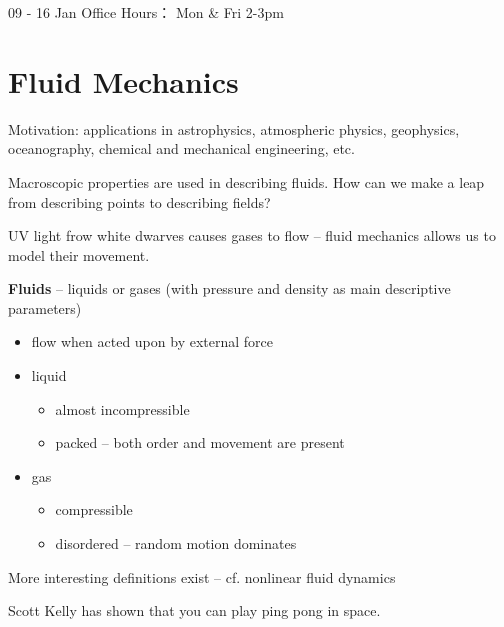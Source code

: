 \documentclass[11pt]{scrartcl}
\begin{document}
09 - 16 Jan Office Hours： Mon \& Fri 2-3pm

\section{Fluid Mechanics}
\label{sec:fmech}

Motivation: applications in astrophysics, atmospheric physics,
geophysics, oceanography, chemical and mechanical engineering, etc.

\begin{note*}
  Macroscopic properties are used in describing fluids. How can we
  make a leap from describing points to describing fields?
\end{note*}

\begin{example}

  UV light frow white dwarves causes gases to flow -- fluid mechanics
  allows us to model their movement.

\end{example}

\begin{definition}
  \textbf{Fluids} -- liquids or gases (with pressure and density as
  main descriptive parameters)

  \begin{itemize}
  \item flow when acted upon by external force
  \item liquid \begin{itemize}
    \item almost incompressible
    \item packed -- both order and movement are present
    \end{itemize} 
  \item gas \begin{itemize}
    \item compressible
    \item disordered -- random motion dominates
    \end{itemize}
  \end{itemize}
\end{definition}
\begin{note*}
More interesting definitions exist -- cf. nonlinear fluid dynamics
\end{note*}

\begin{example}

Scott Kelly has shown that you can play ping pong in space.

\end{example}
\end{document}
